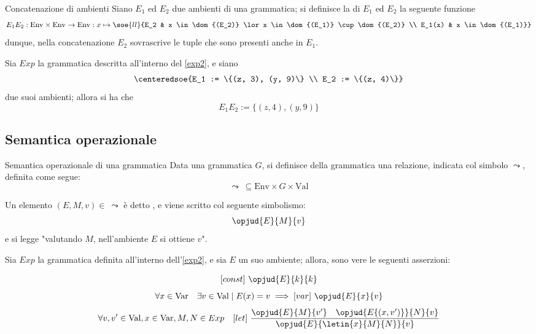 \documentclass[a4paper, 12pt]{report}
\begin{document}
    \begin{frameddefn}{Concatenazione di ambienti}
        Siano $E_1$ ed $E_2$ due ambienti di una grammatica; si definisce la  di $E_1$ ed $E_2$ la seguente funzione $$E_1E_2: \mathrm{Env} \times \mathrm{Env} \to \mathrm{Env} : x \mapsto \soe{ll}{E_2 & x \in \dom{(E_2)} \lor x \in \dom{(E_1)} \cup \dom{(E_2)} \\ E_1(x) & x \in \dom{(E_1)}}$$ dunque, nella concatenazione $E_2$ sovrascrive le tuple che sono presenti anche in $E_1$.
    \end{frameddefn}

    \begin{example}
        Sia $Exp$ la grammatica descritta all'interno del \cref{exp2}, e siano $$\centeredsoe{E_1 := \{(z, 3), (y, 9)\} \\ E_2 := \{(z, 4)\}}$$ due suoi ambienti; allora si ha che $$E_1E_2 := \{(z, 4), (y, 9)\}$$
    \end{example}

    \subsection{Semantica operazionale}

    \begin{frameddefn}[label={sem opexp}]{Semantica operazionale di una grammatica}
        Data una grammatica $G$, si definisce  della grammatica una relazione, indicata col simbolo $\leadsto$, definita come segue: $$\leadsto \ \subseteq \mathrm{Env} \times G \times \mathrm{Val}$$

        Un elemento $(E, M, v) \in \ \leadsto$ è detto , e viene scritto col seguente simbolismo: $$\opjud{E}{M}{v}$$ e si legge "valutando $M$, nell'ambiente $E$ si ottiene $v$".
    \end{frameddefn}

    \begin{example}
        Sia $Exp$ la grammatica definita all'interno dell'\cref{exp2}, e sia $E$ un suo ambiente; allora, sono vere le seguenti asserzioni:
        
        $$[const] \ \opjud{E}{k}{k}$$
        $$\forall x \in \mathrm{Var} \quad \exists v \in \mathrm{Val} \mid E(x) = v \implies [var] \ \opjud{E}{x}{v}$$
        $$\forall v, v' \in \mathrm{Val}, x \in \mathrm{Var}, M, N \in Exp \quad [let] \ \dfrac{\opjud{E}{M}{v'} \quad \opjud{E\{(x, v')\}}{N}{v}}{\opjud{E}{\letin{x}{M}{N}}{v}}$$
    \end{example}
\end{document}
